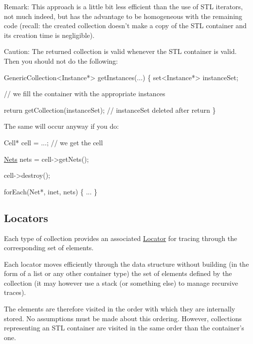 \begin{DoxyParagraph}{Remark\-:}
This approach is a little bit less efficient than the use of S\-T\-L iterators, not much indeed, but has the advantage to be homogeneous with the remaining code (recall\-: the created collection doesn't make a copy of the S\-T\-L container and its creation time is negligible).
\end{DoxyParagraph}
\begin{DoxyParagraph}{Caution\-:}
The returned collection is valid whenever the S\-T\-L container is valid. Then you should not do the following\-: 
\begin{DoxyCode}
GenericCollection<Instance*> getInstances(...)
\{
   set<Instance*> instanceSet;
 
   \textcolor{comment}{// we fill the container with the appropriate instances}
 
   \textcolor{keywordflow}{return} getCollection(instanceSet); \textcolor{comment}{// instanceSet deleted after return}
\}
\end{DoxyCode}

\end{DoxyParagraph}
The same will occur anyway if you do\-: 
\begin{DoxyCode}
Cell* cell = ...; \textcolor{comment}{// we get the cell}
 
\hyperlink{namespaceHurricane_a3404a8b17130a1824f4a281704b04df7}{Nets} nets = cell->getNets();
 
cell->destroy();
 
forEach(Net*, inet, nets) \{
   ...
\}
\end{DoxyCode}
\hypertarget{classHurricane_1_1Collection_secCollectionLocators}{}\subsection{Locators}\label{classHurricane_1_1Collection_secCollectionLocators}
Each type of collection provides an associated \hyperlink{classHurricane_1_1Locator}{Locator} for tracing through the corresponding set of elements.

Each locator moves efficiently through the data structure without building (in the form of a list or any other container type) the set of elements defined by the collection (it may however use a stack (or something else) to manage recursive traces).

The elements are therefore visited in the order with which they are internally stored. No assumptions must be made about this ordering. However, collections representing an S\-T\-L container are visited in the same order than the container's one.


